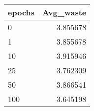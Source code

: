 \begin{tabular}{lr}
\toprule
epochs &  Avg\_waste \\
\midrule
     0 &   3.855678 \\
     1 &   3.855678 \\
    10 &   3.915946 \\
    25 &   3.762309 \\
    50 &   3.866541 \\
   100 &   3.645198 \\
\bottomrule
\end{tabular}
